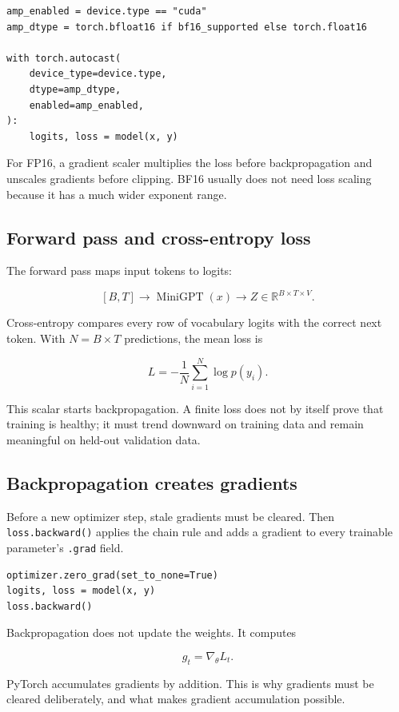 \begin{lstlisting}[style=shadedpython]
amp_enabled = device.type == "cuda"
amp_dtype = torch.bfloat16 if bf16_supported else torch.float16

with torch.autocast(
    device_type=device.type,
    dtype=amp_dtype,
    enabled=amp_enabled,
):
    logits, loss = model(x, y)
\end{lstlisting}

For FP16, a gradient scaler multiplies the loss before backpropagation and
unscales gradients before clipping. BF16 usually does not need loss scaling
because it has a much wider exponent range.

\subsection{Forward pass and cross-entropy loss}

The forward pass maps input tokens to logits:

\[
  [B,T]\longrightarrow\operatorname{MiniGPT}(x)
  \longrightarrow Z\in\mathbb{R}^{B\times T\times V}.
\]

Cross-entropy compares every row of vocabulary logits with the correct next
token. With \(N=B\times T\) predictions, the mean loss is

\[
  L=-\frac{1}{N}\sum_{i=1}^{N}\log p(y_i).
\]

This scalar starts backpropagation. A finite loss does not by itself prove
that training is healthy; it must trend downward on training data and remain
meaningful on held-out validation data.

\subsection{Backpropagation creates gradients}

Before a new optimizer step, stale gradients must be cleared. Then
\texttt{loss.backward()} applies the chain rule and adds a gradient to every
trainable parameter's \texttt{.grad} field.

\begin{lstlisting}[style=shadedpython]
optimizer.zero_grad(set_to_none=True)
logits, loss = model(x, y)
loss.backward()
\end{lstlisting}

Backpropagation does not update the weights. It computes

\[
  g_t=\nabla_{\theta}L_t.
\]

PyTorch accumulates gradients by addition. This is why gradients must be
cleared deliberately, and what makes gradient accumulation possible.

